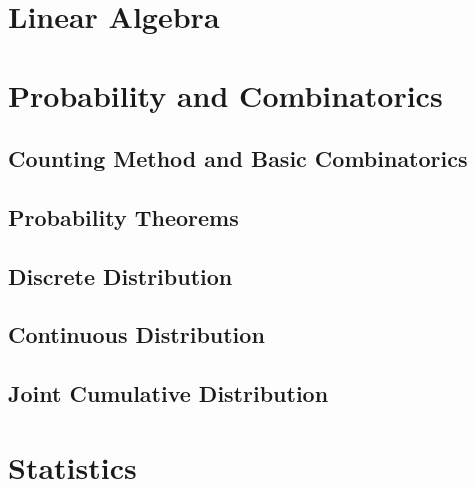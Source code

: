 \documentclass[
	12pt, %
	fleqn, %
	a4paper, %
]{LegrandOrangeBook}
\begin{document}
\part{Linear Algebra}
\part{Probability and Combinatorics}

\chapterspaceabove{6.75cm} 
\chapterspacebelow{7.25cm} 
\chapter{Counting Method and Basic Combinatorics}


\chapterspaceabove{6.75cm} 
\chapterspacebelow{7.25cm} 
\chapter{Probability Theorems}


\chapterspaceabove{6.75cm} 
\chapterspacebelow{7.25cm} 
\chapter{Discrete Distribution}


\chapterspaceabove{6.75cm} 
\chapterspacebelow{7.25cm} 
\chapter{Continuous Distribution}


\chapterspaceabove{6.75cm} 
\chapterspacebelow{7.25cm} 
\chapter{Joint Cumulative Distribution}
\part{Statistics}



\stopcontents[part] %
\end{document}
